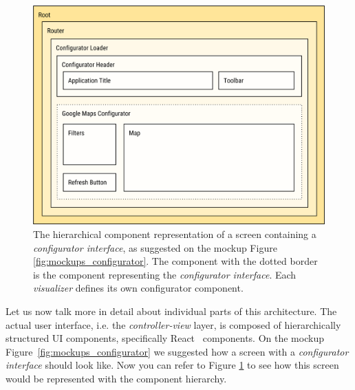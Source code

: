 \begin{figure}
	\centering
	\includegraphics[width=120mm]{img/04_frontend_react_component_hierarchy.png}
	\caption{The hierarchical component representation of a screen containing a \emph{configurator interface}, as suggested on the mockup Figure \ref{fig:mockups_configurator}. The component with the dotted border is the component representing the \emph{configurator interface}. Each \emph{visualizer} defines its own configurator component.} 
	\label{fig:frontend-react-component-hierarchy}
\end{figure}

Let us now talk more in detail about individual parts of this architecture. The actual user interface, i.e. the \emph{controller-view} layer, is composed of hierarchically structured UI components, specifically React~\cite{react} components. On the mockup Figure~\ref{fig:mockups_configurator} we suggested how a screen with a \emph{configurator interface} should look like. Now you can refer to Figure \ref{fig:frontend-react-component-hierarchy} to see how this screen would be represented with the component hierarchy.


